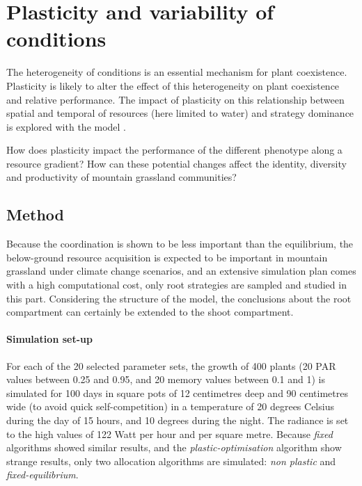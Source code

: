 \section{Plasticity and variability of conditions}
The heterogeneity of conditions is an essential mechanism for plant coexistence. Plasticity is likely to alter the effect of this heterogeneity on plant coexistence and relative performance. The impact of plasticity on this relationship between spatial and temporal  of resources (here limited to water) and strategy dominance is explored with the model \model.

How does plasticity impact the performance of the different phenotype along a resource gradient? How can these potential changes affect the identity, diversity and productivity of mountain grassland communities?



\subsection{Method}

Because the coordination is shown to be less important than the equilibrium, the below-ground resource acquisition is expected to be important in mountain grassland under climate change scenarios, and an extensive simulation plan comes with a high computational cost, only root strategies are sampled and studied in this part. Considering the structure of the model, the conclusions about the root compartment can certainly be extended to the shoot compartment.

\paragraph{Simulation set-up}
For each of the 20 selected parameter sets, the growth of 400 plants (20 PAR values between 0.25 and 0.95, and 20 memory values between 0.1 and 1) is simulated for 100 days in square pots of 12 centimetres deep and 90 centimetres wide (to avoid quick self-competition) in a temperature of 20 degrees Celsius during the day of 15 hours, and 10 degrees during the night. The radiance is set to the high values of 122 Watt per hour and per square metre. Because \textit{fixed} algorithms showed similar results, and the \textit{plastic-optimisation} algorithm show strange results, only two allocation algorithms are simulated: \textit{non plastic} and \textit{fixed-equilibrium}.

